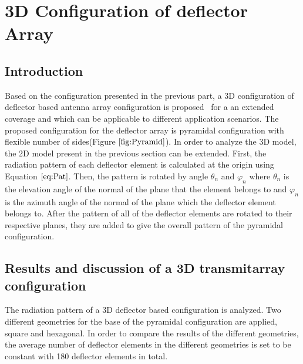 \documentclass[titlepage]{article}
\begin{document}
\section{3D Configuration of deflector Array}
\subsection{Introduction}
Based on the configuration presented in the previous part, a 3D configuration of deflector based antenna array configuration is proposed~\cite{4} for a an extended coverage and which can be applicable to different application scenarios.
The proposed configuration for the deflector array is pyramidal configuration with flexible number of sides(Figure $\ref{fig:Pyramid}$).
\newline
In order to analyze the 3D model, the 2D model present in the previous section can be extended. First, the radiation pattern of each deflector element is calculated at the origin using Equation $\ref{eq:Pat}$. Then, the pattern is rotated by  angle $\theta_n$ and $\varphi_n$ where $\theta_n$ is the elevation angle of the normal of the plane that the element belongs to and $\varphi_n$ is the azimuth angle of the normal of the plane which the deflector element belongs to. After the pattern of all of the deflector elements are rotated to their respective planes, they are added to give the overall pattern of the pyramidal configuration.
\newpage
\subsection{Results and discussion of a 3D transmitarray configuration}
The radiation pattern of a 3D deflector based configuration is analyzed. Two different geometries for the base of the pyramidal configuration are applied, square and hexagonal. In order to compare the results of the different geometries, the average number of deflector elements in the different geometries is set to be constant with 180 deflector elements in total.
\end{document}
